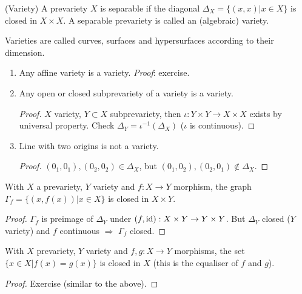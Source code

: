 \documentclass[a4paper,11pt]{article}
\begin{document}
			\begin{defi}(Variety)
				A prevariety $X$ is separable if the diagonal $\Delta_X=\{(x,x)|x\in X\}$ is closed in $X\times X$. A separable prevariety is called an (algebraic) variety.
			\end{defi}

			Varieties are called curves, surfaces and hypersurfaces according to their dimension.

			\begin{eg}\label{ex--varieties}
				\begin{enumerate}
					\item Any affine variety is a variety. \textit{Proof}: exercise.
					\item Any open or closed subprevariety of a variety is a variety.
						\begin{proof}
							$X$ variety, $Y\subset X$ subprevariety, then $\iota:Y\times Y\rightarrow X\times X$ exists by universal property. Check $\Delta_Y=\iota^{-1}(\Delta_X)$ ($\iota$ is continuous).
						\end{proof}
					\item Line with two origins is not a variety.
						\begin{proof}
							$(0_1,0_1),(0_2,0_2)\in\Delta_X$, but $(0_1,0_2),(0_2,0_1)\notin\Delta_X$.
						\end{proof}
				\end{enumerate}
			\end{eg}

			\begin{prop}
				With $X$ a prevariety, $Y$ variety and $f:X\rightarrow Y$ morphism, the graph $\Gamma_f=\{(x,f(x))|x\in X\}$ is closed in $X\times Y$.  
			\end{prop}
			\begin{proof}
				$\Gamma_f$ is preimage of $\Delta_Y$ under $(f,\operatorname{id}):X\times Y\rightarrow Y\times Y$. But $\Delta_Y$ closed ($Y$ variety) and $f$ continuous $\Longrightarrow$ $\Gamma_f$ closed.
			\end{proof}

			\begin{prop}
				With $X$ prevariety, $Y$ variety and $f,g:X\rightarrow Y$ morphisms, the set $\{x\in X|f(x)=g(x)\}$ is closed in $X$ (this is the equaliser of $f$ and $g$).
			\end{prop}
			\begin{proof}\renewcommand{\qedsymbol}{}
				Exercise (similar to the above).
			\end{proof}\renewcommand{\qedsymbol}{$\square$}
\end{document}
